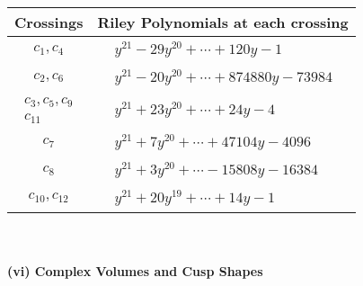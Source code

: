 \documentclass[1p]{elsarticle_modified}
\theoremstyle{definition}
\begin{document}
\begin{tabular}{m{50pt}|m{274pt}}
Crossings & \hspace{64pt}Riley Polynomials at each crossing \\
\hline $$\begin{aligned}c_{1},c_{4}\end{aligned}$$&$\begin{aligned}
&y^{21}-29 y^{20}+\cdots+120 y-1
\end{aligned}$\\
\hline $$\begin{aligned}c_{2},c_{6}\end{aligned}$$&$\begin{aligned}
&y^{21}-20 y^{20}+\cdots+874880 y-73984
\end{aligned}$\\
\hline $$\begin{aligned}c_{3},c_{5},c_{9}\\c_{11}\end{aligned}$$&$\begin{aligned}
&y^{21}+23 y^{20}+\cdots+24 y-4
\end{aligned}$\\
\hline $$\begin{aligned}c_{7}\end{aligned}$$&$\begin{aligned}
&y^{21}+7 y^{20}+\cdots+47104 y-4096
\end{aligned}$\\
\hline $$\begin{aligned}c_{8}\end{aligned}$$&$\begin{aligned}
&y^{21}+3 y^{20}+\cdots-15808 y-16384
\end{aligned}$\\
\hline $$\begin{aligned}c_{10},c_{12}\end{aligned}$$&$\begin{aligned}
&y^{21}+20 y^{19}+\cdots+14 y-1
\end{aligned}$\\
\hline
\end{tabular}\\~\\
\newpage\flushleft \textbf{(vi) Complex Volumes and Cusp Shapes}
\end{document}
